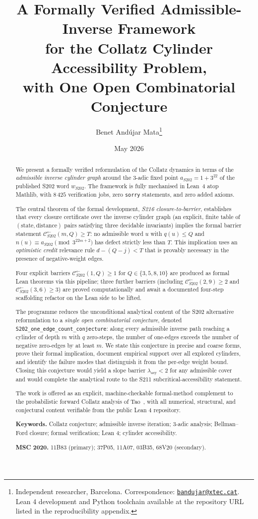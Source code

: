 \documentclass[11pt,a4paper]{article}
\title{A Formally Verified Admissible-Inverse Framework\\
       for the Collatz Cylinder Accessibility Problem,\\
       with One Open Combinatorial Conjecture}
\author{Benet And\'ujar Mata\thanks{%
   Independent researcher, Barcelona.
   Correspondence: \href{mailto:bandujar@xtec.cat}{\texttt{bandujar@xtec.cat}}.
   Lean 4 development and Python toolchain available at the
   repository URL listed in the reproducibility appendix.}}
\date{May 2026}
\theoremstyle{plain}
\theoremstyle{definition}
\newcommand{\aS}{a_{S202}}
\newcommand{\wS}{w_{S202}}
\newcommand{\Cback}{\mathcal{C}^{\!\leftarrow}_{S202}}
\begin{document}
\maketitle

\begin{abstract}
We present a formally verified reformulation of the Collatz dynamics
in terms of the \emph{admissible inverse cylinder graph} around the
3-adic fixed point $\aS = 1 + 3^{22}$ of the published S202 word
$\wS$. The framework is fully mechanised in Lean~4 atop Mathlib, with
$8\,425$ verification jobs, zero \texttt{sorry} statements, and zero
added axioms.

The central theorem of the formal development,
\emph{S216 closure-to-barrier}, establishes that every closure
certificate over the inverse cylinder graph (an explicit, finite
table of $(\text{state},\text{distance})$ pairs satisfying three
decidable invariants) implies the formal barrier statement
$\Cback(m, Q) \ge T$: no admissible word $u$ with $q(u) \le Q$ and
$n(u) \equiv \aS \pmod{3^{22m+2}}$ has defect strictly less than $T$.
This implication uses an \emph{optimistic credit} relevance rule
\(d - (Q - j) < T\) that is provably necessary in the presence of
negative-weight edges.

Four explicit barriers $\Cback(1, Q) \ge 1$ for $Q \in \{3, 5, 8, 10\}$
are produced as formal Lean theorems via this pipeline; three further
barriers (including $\Cback(2, 9) \ge 2$ and $\Cback(3, 6) \ge 3$) are
proved computationally and await a documented four-step scaffolding
refactor on the Lean side to be lifted.

The programme reduces the unconditional analytical content of the
S202 alternative reformulation to a \emph{single open combinatorial
conjecture}, denoted
\texttt{S202\_one\_edge\_count\_conjecture}: along every admissible
inverse path reaching a cylinder of depth $m$ with $q$ zero-steps,
the number of one-edges exceeds the number of negative zero-edges by
at least $m$. We state this conjecture in precise and coarse forms,
prove their formal implication, document empirical support over all
explored cylinders, and identify the failure modes that distinguish
it from the per-edge weight bound. Closing this conjecture would
yield a slope barrier $\lambda_{\mathrm{asy}} < 2$ for any admissible
cover and would complete the analytical route to the S211
subcritical-accessibility statement.

The work is offered as an explicit, machine-checkable formal-method
complement to the probabilistic forward Collatz analysis of
Tao~\cite{tao2022}, with all numerical, structural, and conjectural
content verifiable from the public Lean 4 repository.

\medskip\noindent\textbf{Keywords.} Collatz conjecture; admissible inverse iteration; 3-adic
analysis; Bellman--Ford closure; formal verification; Lean 4; cylinder
accessibility.

\medskip\noindent\textbf{MSC 2020.} 11B83 (primary); 37P05, 11A07, 03B35, 68V20 (secondary).
\end{abstract}
\end{document}
